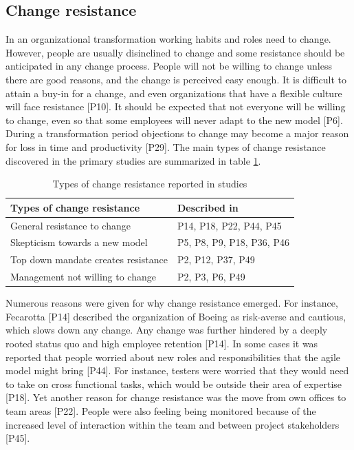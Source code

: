\subsection{Change resistance}

In an organizational transformation working habits and roles need to change.
However, people are usually disinclined to change and some resistance should be
anticipated in any change process. People will not be willing to change unless
there are good reasons, and the change is perceived easy enough. It is difficult
to attain a buy-in for a change, and even organizations that have a flexible
culture will face resistance [P10]. It should be expected that not everyone will
be willing to change, even so that some employees will never adapt to the new
model [P6]. During a transformation period objections to change may become a
major reason for loss in time and productivity [P29]. The main types of change
resistance discovered in the primary studies are summarized in table
\ref{table:challenges_changeresistance}.

\begin{table}[b]
    \centering
    \begin{tabular}{ l l }
        \toprule
        Types of change resistance           &  Described in  \\
        \midrule
        General resistance to change         &  P14, P18, P22, P44, P45   \\
        Skepticism towards a new model       &  P5, P8, P9, P18, P36, P46 \\
        Top down mandate creates resistance  &  P2, P12, P37, P49 \\
        Management not willing to change     &  P2, P3, P6, P49 \\
        \bottomrule
    \end{tabular}
    \caption{Types of change resistance reported in studies}
    \label{table:challenges_changeresistance}
\end{table}

Numerous reasons were given for why change resistance emerged. For
instance, Fecarotta [P14] described the organization of Boeing as risk-averse
and cautious, which slows down any change. Any change was further hindered by a
deeply rooted status quo and high employee retention [P14]. In some cases it was
reported that people worried about new roles and responsibilities that the agile
model might bring [P44]. For instance, testers were worried that they would need
to take on cross functional tasks, which would be outside their area of
expertise [P18]. Yet another reason for change resistance was the move from own
offices to team areas [P22]. People were also feeling being monitored because of
the increased level of interaction within the team and between project
stakeholders [P45].

